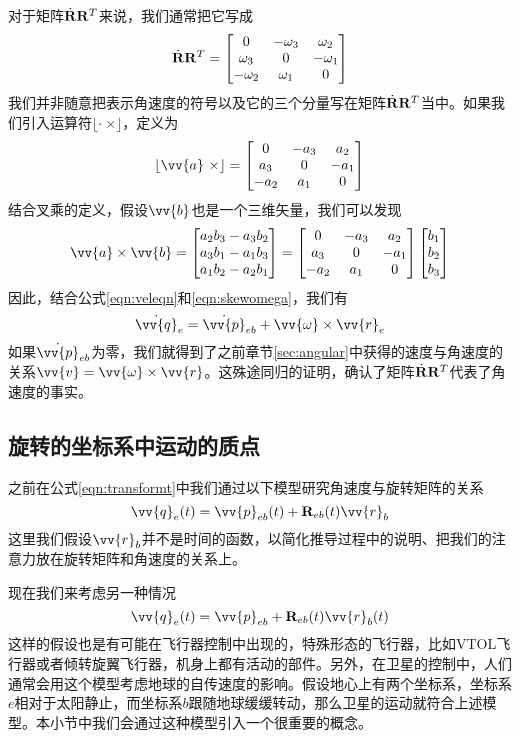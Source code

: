 \documentclass[11pt]{article}
\begin{document}
对于矩阵$\dot{{\bf R}}{\bf R}^T$来说，我们通常把它写成
\begin{equation}\label{eqn:skewomega}
\dot{{\bf R}}{\bf R}^T = \begin{bmatrix}
0 & -\omega_3 & \omega_2\\
\omega_3 & 0 & - \omega_1\\
-\omega_2 & \omega_1 & 0
\end{bmatrix}
\end{equation}
我们并非随意把表示角速度的符号以及它的三个分量写在矩阵$\dot{{\bf R}}{\bf R}^T$当中。如果我们引入运算符$\lfloor \cdot \ \times \rfloor$，定义为
$$
\lfloor \vv{a} \ \times \rfloor =  \begin{bmatrix}
0 & -a_3 & a_2\\
a_3 & 0 & - a_1\\
-a_2 & a_1 & 0
\end{bmatrix}
$$
结合叉乘的定义，假设$\vv{b}$也是一个三维矢量，我们可以发现
$$
\vv{a} \times \vv{b} = 
\begin{bmatrix}
a_2b_3-a_3b_2\\
a_3b_1-a_1b_3\\
a_1b_2-a_2b_1
\end{bmatrix} =
\begin{bmatrix}
0 & -a_3 & a_2\\
a_3 & 0 & - a_1\\
-a_2 & a_1 & 0
\end{bmatrix}
\begin{bmatrix}
b_1\\
b_2\\
b_3
\end{bmatrix}
$$
因此，结合公式\ref{eqn:veleqn}和\ref{eqn:skewomega}，我们有
$$
\dot{\vv{q}}_{e}  = \dot{ \vv{p}}_{eb} + \vv{\omega} \times \vv{r}_e
$$
如果$\dot{ \vv{p}}_{eb}$为零，我们就得到了之前章节\ref{sec:angular}中获得的速度与角速度的关系$\vv{v} = \vv{\omega} \times \vv{r}$。这殊途同归的证明，确认了矩阵$\dot{{\bf R}}{\bf R}^T$代表了角速度的事实。

\subsection{旋转的坐标系中运动的质点}
之前在公式\ref{eqn:transformt}中我们通过以下模型研究角速度与旋转矩阵的关系
$$
\vv{q}_{e}(t) = \vv{p}_{eb}(t) + {\bf R}_{eb}(t)\vv{r}_b
$$
这里我们假设$\vv{r}_b$并不是时间的函数，以简化推导过程中的说明、把我们的注意力放在旋转矩阵和角速度的关系上。

现在我们来考虑另一种情况
\begin{equation}\label{eqn:transformt2}
\vv{q}_{e}(t) = \vv{p}_{eb} + {\bf R}_{eb}(t)\vv{r}_b(t)
\end{equation}
这样的假设也是有可能在飞行器控制中出现的，特殊形态的飞行器，比如VTOL飞行器或者倾转旋翼飞行器，机身上都有活动的部件。另外，在卫星的控制中，人们通常会用这个模型考虑地球的自传速度的影响。假设地心上有两个坐标系，坐标系$e$相对于太阳静止，而坐标系$b$跟随地球缓缓转动，那么卫星的运动就符合上述模型。本小节中我们会通过这种模型引入一个很重要的概念。
\end{document}
